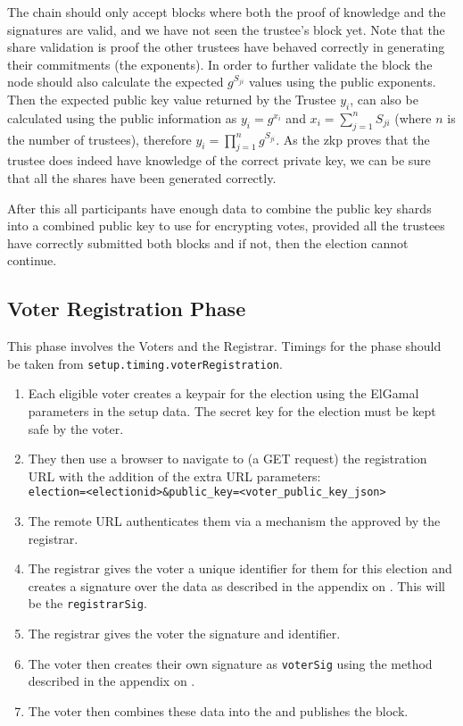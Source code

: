The chain should only accept blocks where both the proof of knowledge and the signatures are valid, and we have not seen the trustee's block yet. Note that the share validation is proof the other trustees have behaved correctly in generating their commitments (the exponents). In order to further validate the block the node should also calculate the expected $g^{S_{ji}}$ values using the public exponents. Then the expected public key value returned by the Trustee $y_i$, can also be calculated using the public information as $y_i = g^{x_i}$ and $x_i = \sum\limits_{j=1}^{n} S_{ji}$ (where $n$ is the number of trustees), therefore $y_i = \prod\limits_{j=1}^{n} g^{S_{ji}}$. As the \gls{zkp} proves that the trustee does indeed have knowledge of the correct private key, we can be sure that all the shares have been generated correctly.

After this all participants have enough data to combine the public key shards into a combined public key to use for encrypting votes, provided all the trustees have correctly submitted both blocks and if not, then the election cannot continue.

\subsection{Voter Registration Phase}
\label{ch:astris:detail:registration}

This phase involves the Voters and the Registrar. Timings for the phase should be taken from \texttt{setup.timing.voterRegistration}.

\begin{enumerate}
    \item Each eligible voter creates a keypair for the election using the ElGamal parameters in the setup data. The secret key for the election must be kept safe by the voter.
    \item They then use a browser to navigate to (a GET request) the registration URL with the addition of the extra URL parameters:\\ \verb|election=<electionid>&public_key=<voter_public_key_json>|
    \item The remote URL authenticates them via a mechanism the approved by the registrar.
    \item The registrar gives the voter a unique identifier for them for this election and creates a signature over the data as described in the appendix on . This will be the \texttt{registrarSig}.
    \item The registrar gives the voter the signature and identifier.
    \item The voter then creates their own signature as \texttt{voterSig} using the method described in the appendix on .
    \item The voter then combines these data into the  and publishes the block.
\end{enumerate}

